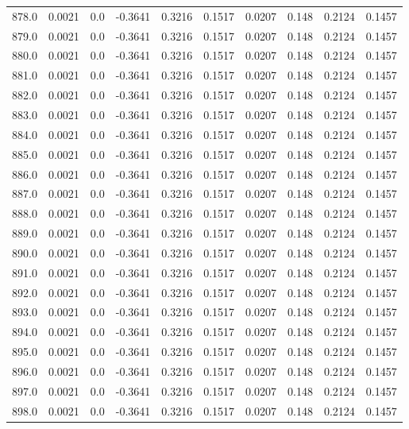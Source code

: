\begin{longtable}{lrrrrrrrrr}
878.0 & 0.0021 & 0.0 & -0.3641 & 0.3216 & 0.1517 & 0.0207 & 0.148 & 0.2124 & 0.1457 \\
879.0 & 0.0021 & 0.0 & -0.3641 & 0.3216 & 0.1517 & 0.0207 & 0.148 & 0.2124 & 0.1457 \\
880.0 & 0.0021 & 0.0 & -0.3641 & 0.3216 & 0.1517 & 0.0207 & 0.148 & 0.2124 & 0.1457 \\
881.0 & 0.0021 & 0.0 & -0.3641 & 0.3216 & 0.1517 & 0.0207 & 0.148 & 0.2124 & 0.1457 \\
882.0 & 0.0021 & 0.0 & -0.3641 & 0.3216 & 0.1517 & 0.0207 & 0.148 & 0.2124 & 0.1457 \\
883.0 & 0.0021 & 0.0 & -0.3641 & 0.3216 & 0.1517 & 0.0207 & 0.148 & 0.2124 & 0.1457 \\
884.0 & 0.0021 & 0.0 & -0.3641 & 0.3216 & 0.1517 & 0.0207 & 0.148 & 0.2124 & 0.1457 \\
885.0 & 0.0021 & 0.0 & -0.3641 & 0.3216 & 0.1517 & 0.0207 & 0.148 & 0.2124 & 0.1457 \\
886.0 & 0.0021 & 0.0 & -0.3641 & 0.3216 & 0.1517 & 0.0207 & 0.148 & 0.2124 & 0.1457 \\
887.0 & 0.0021 & 0.0 & -0.3641 & 0.3216 & 0.1517 & 0.0207 & 0.148 & 0.2124 & 0.1457 \\
888.0 & 0.0021 & 0.0 & -0.3641 & 0.3216 & 0.1517 & 0.0207 & 0.148 & 0.2124 & 0.1457 \\
889.0 & 0.0021 & 0.0 & -0.3641 & 0.3216 & 0.1517 & 0.0207 & 0.148 & 0.2124 & 0.1457 \\
890.0 & 0.0021 & 0.0 & -0.3641 & 0.3216 & 0.1517 & 0.0207 & 0.148 & 0.2124 & 0.1457 \\
891.0 & 0.0021 & 0.0 & -0.3641 & 0.3216 & 0.1517 & 0.0207 & 0.148 & 0.2124 & 0.1457 \\
892.0 & 0.0021 & 0.0 & -0.3641 & 0.3216 & 0.1517 & 0.0207 & 0.148 & 0.2124 & 0.1457 \\
893.0 & 0.0021 & 0.0 & -0.3641 & 0.3216 & 0.1517 & 0.0207 & 0.148 & 0.2124 & 0.1457 \\
894.0 & 0.0021 & 0.0 & -0.3641 & 0.3216 & 0.1517 & 0.0207 & 0.148 & 0.2124 & 0.1457 \\
895.0 & 0.0021 & 0.0 & -0.3641 & 0.3216 & 0.1517 & 0.0207 & 0.148 & 0.2124 & 0.1457 \\
896.0 & 0.0021 & 0.0 & -0.3641 & 0.3216 & 0.1517 & 0.0207 & 0.148 & 0.2124 & 0.1457 \\
897.0 & 0.0021 & 0.0 & -0.3641 & 0.3216 & 0.1517 & 0.0207 & 0.148 & 0.2124 & 0.1457 \\
898.0 & 0.0021 & 0.0 & -0.3641 & 0.3216 & 0.1517 & 0.0207 & 0.148 & 0.2124 & 0.1457 \\

\end{longtable}
